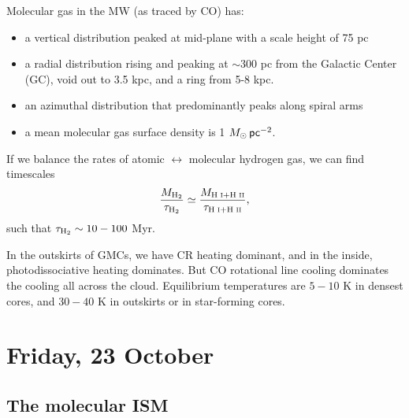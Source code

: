 \documentclass{tufte-handout}
\renewcommand{\rm}{\sf}
\newcommand{\HI}{\textnormal{H{\smaller~\textsc{I}}}}
\newcommand{\HII}{\textnormal{H{\smaller~\textsc{II}}}}
\newcommand{\Htwo}{\textnormal{H$_2$}}
\begin{document}
Molecular gas in the MW (as traced by CO) has:
\begin{itemize}
\item a vertical distribution peaked at mid-plane with a scale height of 75 pc
\item a radial distribution rising and peaking at $\sim 300$ pc from the Galactic Center (GC), void out to 3.5 kpc, and a ring from 5-8 kpc.
\item an azimuthal distribution that predominantly peaks along spiral arms
\item a mean molecular gas surface density is 1 $M_\odot\, {\rm pc}^{-2}$.
\end{itemize}

If we balance the rates of atomic $\leftrightarrow$ molecular hydrogen gas, we can find timescales
\[\frac{M_{\Htwo{}}}{\tau_{\Htwo{}}} \simeq \frac{M_{\HI{} + \HII{}}}{\tau_{\HI{} + \HII{}}},\]
such that $\tau_{\Htwo} \sim 10-100$ Myr.

In the outskirts of GMCs, we have CR heating dominant, and in the inside, photodissociative heating dominates. But CO rotational line cooling dominates the cooling all across the cloud. Equilibrium temperatures are $5-10$ K in densest cores, and $30-40$ K in outskirts or in star-forming cores.

\section{Friday, 23 October}

\subsection{The molecular ISM}
\end{document}
